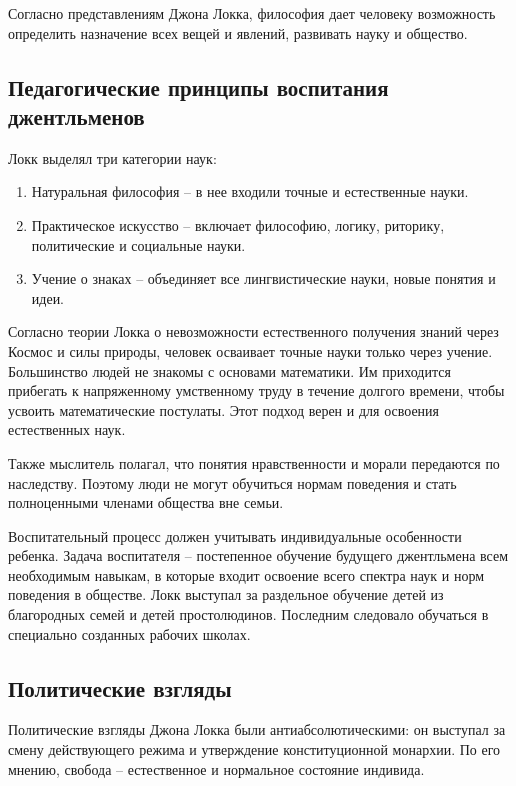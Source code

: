 \documentclass[a4paper, 14pt]{extreport}
\begin{document}
Согласно представлениям Джона Локка, философия дает человеку возможность
определить назначение всех вещей и явлений, развивать науку и общество.

\subsection{Педагогические принципы воспитания джентльменов}

Локк выделял три категории наук:

\begin{enumerate}
\def\labelenumi{\arabic{enumi}.}

\item
  Натуральная философия -- в нее входили точные и естественные науки.
\item
  Практическое искусство -- включает философию, логику, риторику,
  политические и социальные науки.
\item
  Учение о знаках -- объединяет все лингвистические науки, новые понятия
  и идеи.
\end{enumerate}

Согласно теории Локка о невозможности естественного получения знаний
через Космос и силы природы, человек осваивает точные науки только через
учение. Большинство людей не знакомы с основами математики. Им
приходится прибегать к напряженному умственному труду в течение долгого
времени, чтобы усвоить математические постулаты. Этот подход верен и для
освоения естественных наук.

Также мыслитель полагал, что понятия нравственности и морали передаются
по наследству. Поэтому люди не могут обучиться нормам поведения и стать
полноценными членами общества вне семьи.

Воспитательный процесс должен учитывать индивидуальные особенности
ребенка. Задача воспитателя -- постепенное обучение будущего джентльмена
всем необходимым навыкам, в которые входит освоение всего спектра наук и
норм поведения в обществе. Локк выступал за раздельное обучение детей из
благородных семей и детей простолюдинов. Последним следовало обучаться в
специально созданных рабочих школах.

\subsection{Политические взгляды}

Политические взгляды Джона Локка были антиабсолютическими: он выступал
за смену действующего режима и утверждение конституционной монархии. По
его мнению, свобода -- естественное и нормальное состояние индивида.
\end{document}
